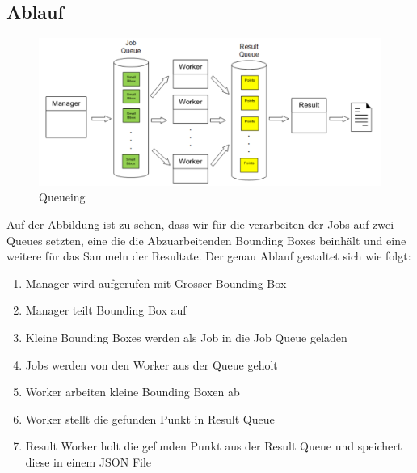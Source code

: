 \subsection{Ablauf}
\label{subsec:ablauf}
\begin{figure}[H]
\includegraphics[width=\textwidth]{images/queuing.png}
\caption[Queueing]{Queueing}
\end{figure}
Auf der Abbildung ist zu sehen, dass wir für die verarbeiten der Jobs auf zwei Queues setzten, eine die die Abzuarbeitenden Bounding Boxes beinhält und eine weitere für das Sammeln der Resultate. Der genau Ablauf gestaltet sich wie folgt:
\begin{enumerate}
		\item Manager wird aufgerufen mit Grosser Bounding Box
		\item Manager teilt Bounding Box auf
		\item Kleine Bounding Boxes werden als Job in die Job Queue geladen
		\item Jobs werden von den Worker aus der Queue geholt
		\item Worker arbeiten kleine Bounding Boxen ab
		\item Worker stellt die gefunden Punkt in Result Queue
		\item Result Worker holt die gefunden Punkt aus der Result Queue und speichert diese in einem JSON File 
\end{enumerate}









